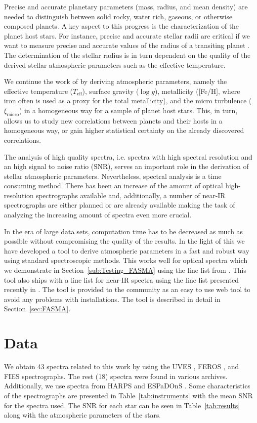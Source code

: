\documentclass{aa}
\begin{document}
Precise and accurate planetary parameters (mass, radius, and mean density) are
needed to distinguish between solid rocky, water rich, gaseous, or otherwise
composed planets. A key aspect to this progress is the characterization of the
planet host stars. For instance, precise and accurate stellar radii are critical
if we want to measure precise and accurate values of the radius of a transiting
planet \citep[see e.g.][]{Torres2012,Mortier2013}. The determination of the
stellar radius is in turn dependent on the quality of the derived stellar
atmospheric parameters such as the effective temperature.

We continue the work of \citet{Santos13} by deriving atmospheric parameters,
namely the effective temperature ($T_\mathrm{eff}$), surface gravity ($\log g$),
metallicity ([Fe/H], where iron often is used as a proxy for the total
metallicity), and the micro turbulence ($\xi_\mathrm{micro}$) in a homogeneous
way for a sample of planet host stars. This, in turn, allows us to study new
correlations between planets and their hosts in a homogeneous way,  or gain
higher statistical certainty on the already discovered correlations.

The analysis of high quality spectra, i.e. spectra with high spectral resolution
and an high  signal to noise ratio (SNR), serves an important role in the
derivation of stellar atmospheric parameters. Nevertheless, spectral analysis is
a time consuming method. There has been an increase of the amount of  optical
high-resolution spectrographs available and, additionally, a number of near-IR
spectrographs are either planned or are already available making the task of
analyzing the increasing amount of spectra even more crucial.

In the era of large data sets, computation time has to be decreased as much as
possible without compromising the quality of the results. In the light of this
we have developed a tool to derive atmospheric parameters in a fast and robust
way using standard spectroscopic methods. This works well for optical spectra
which we demonstrate in Section~\ref{sub:Testing_FASMA} using the line list from
\citet{Sousa2011}. This tool also ships with a line list for near-IR spectra
using the line list presented recently in \citet{Andreasen2016}. The tool is
provided to the community as an easy to use web tool to avoid any problems with
installations. The tool is described in detail in Section~\ref{sec:FASMA}.



\section{Data}
\label{sec:data}
We obtain 43 spectra related to this work by using the UVES \citep{UVES}, FEROS
\citep{FEROS}, and FIES \citep{FIES} spectrographs. The rest (18) spectra were
found in various archives. Additionally, we use spectra from HARPS \citep{HARPS}
and ESPaDOnS \citep{ESPADONS}. Some characteristics of the spectrographs are
presented in Table~\ref{tab:instruments} with the mean SNR for the spectra used.
The SNR for each star can be seen in Table~\ref{tab:results} along with the
atmospheric parameters of the stars.
\end{document}
